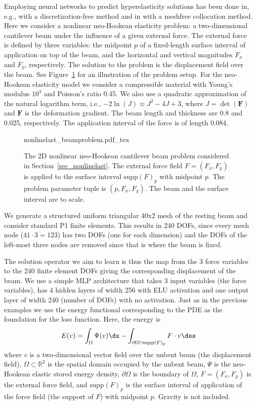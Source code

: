 \documentclass[12pt]{article}
\begin{document}
Employing neural networks to predict hyperelasticity solutions has been done in, e.g., \cite{nguyen_deep_2020} with a discretization-free method and in \cite{brink_neural_2021} with a meshfree collocation method. Here we consider a nonlinear neo-Hookean elasticity problem: a two-dimensional cantilever beam under the influence of a given external force. The external force is defined by three variables: the midpoint $p$ of a fixed-length surface interval of application on top of the beam, and the horizontal and vertical magnitudes $F_x$ and $F_y$, respectively. The solution to the problem is the displacement field over the beam. See Figure~\ref{fig_nonlinelast_beamproblem} for an illustration of the problem setup. For the neo-Hookean elasticity model we consider a compressible material with Young's modulus $10^3$ and Poisson's ratio 0.45. We also use a quadratic approximation of the natural logarithm term, i.e., $-2 \ln(J) \approx J^2 - 4J + 3$, where $J = \det(\mathbf{F})$ and $\mathbf{F}$ is the deformation gradient. The beam length and thickness are 0.8 and 0.025, respectively. The application interval of the force is of length 0.084.
\begin{figure}
\centering
\def\svgwidth{0.8\textwidth}
{nonlinelast_beamproblem.pdf_tex}
\caption{The 2D nonlinear neo-Hookean cantilever beam problem considered in Section~\ref{sec_nonlinelast}. The external force field $F = (F_x, F_y)$ is applied to the surface interval $\text{supp}(F)_p$ with midpoint $p$. The problem parameter tuple is $(p, F_x, F_y)$. The beam and the surface interval are to scale.}
\label{fig_nonlinelast_beamproblem}
\end{figure}
We generate a structured uniform triangular 40x2 mesh of the resting beam and consider standard P1 finite elements. This results in 240 DOFs, since every mesh node ($41\cdot 3 = 123$) has two DOFs (one for each dimension) and the DOFs of the left-most three nodes are removed since that is where the beam is fixed.

The solution operator we aim to learn is thus the map from the 3 force variables to the 240 finite element DOFs giving the corresponding displacement of the beam. We use a simple MLP architecture that takes 3 input variables (the force variables), has 4 hidden layers of width 256 with ELU activation and one output layer of width 240 (number of DOFs) with no activation. Just as in the previous examples we use the energy functional corresponding to the PDE as the foundation for the loss function. Here, the energy is
\begin{align}
E(v) = \int_\Omega \Psi(v) \dx - \int_{\partial \Omega \cap \text{supp}(F)_p} F \cdot v \dss
\end{align}
where $v$ is a two-dimensional vector field over the unbent beam (the displacement field), $\Omega \subset \mathbb{R}^2$ is the spatial domain occupied by the unbent beam, $\Psi$ is the neo-Hookean elastic stored energy density, $\partial \Omega$ is the boundary of $\Omega$, $F = (F_x, F_y)$ is the external force field, and $\text{supp}(F)_p$ is the surface interval of application of the force field (the support of $F$) with midpoint $p$. Gravity is not included.
\end{document}
